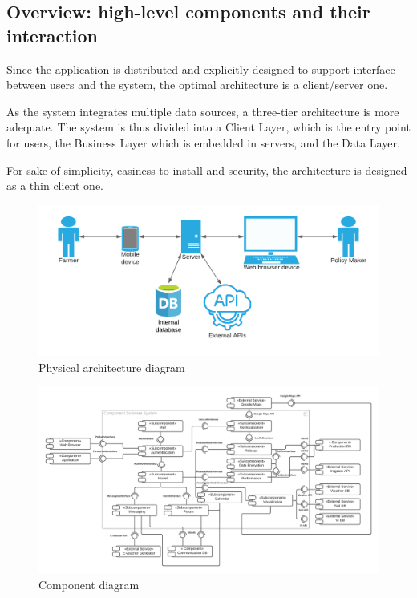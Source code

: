 \subsection{Overview: high-level components and their interaction}

Since the application is distributed and explicitly designed to support interface between users and the system, the optimal architecture is a client/server one. 

As the system integrates multiple data sources, a three-tier architecture is more adequate. The system is thus divided into a Client Layer, which is the entry point for users, the Business Layer which is embedded in servers, and the Data Layer. 

For sake of simplicity, easiness to install and security, the architecture is designed as a thin client one.

\begin{figure} [!h]
	\centering
	\includegraphics[width=\textwidth]{Images/architecture-diagram.png}
	\caption{\label{fig:physical_diag} Physical architecture diagram}
\end{figure}

\begin{figure} [!h]
	\centering
	\includegraphics[width=\textwidth]{Images/component-diagram.png}
	\caption{\label{fig:component_diag} Component diagram}
\end{figure}

